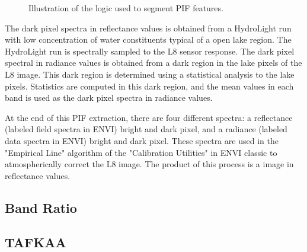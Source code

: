 \begin{figure}
\caption{Illustration of the logic used to segment PIF features. \label{fig:PIFflowchart}}
\end{figure}
The dark pixel spectra in reflectance values is obtained from a HydroLight run with low concentration of water constituents typical of a open lake region. The HydroLight run is spectrally sampled to the L8 sensor response. The dark pixel spectral in radiance values is obtained from a dark region in the lake pixels of the L8 image. This dark region is determined using a statistical analysis to the lake pixels. Statistics are computed in this dark region, and the mean values in each band is used as the dark pixel spectra in radiance values.

At the end of this PIF extraction, there are four different spectra: a reflectance (labeled field spectra in ENVI) bright and dark pixel, and a radiance (labeled data spectra in ENVI) bright and dark pixel. These spectra are used in the "Empirical Line" algorithm of the "Calibration Utilities" in ENVI classic to atmospherically correct the L8 image. The product of this process is a image in reflectance values.




\subsection{Band Ratio}


\subsection{TAFKAA}
